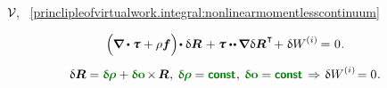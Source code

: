 \vspace{-0.1em} \noindent {}~${\mathcal{V}\hspace{-0.2ex}}$, ~\eqref{princlipleofvirtualwork.integral:nonlinearmomentlesscontinuum}

\nopagebreak\vspace{-0.2em}\begin{equation}\label{princlipleofvirtualwork.local:nonlinearmomentlesscontinuum}
\left(^{\mathstrut} \hspace{-0.2ex} \boldnabla \dotp \cauchystress + \rho \bm{f} \right) \hspace{-0.32ex} \dotp \variation{\bm{R}} \hspace{.2ex}
+ \cauchystress \dotdotp \hspace{-0.12ex} \boldnabla \hspace{.1ex} \variation{\bm{R}}^{\hspace{.1ex}\T} \hspace{-0.32ex}
+ \hspace{.1ex} \variation{\internalwork}
= \hspace{.1ex} 0 \hspace{.1ex}.
\end{equation}



\nopagebreak\vspace{-0.2em}\begin{equation}\label{princlipleofvirtualwork.worknullifies:nonlinearmomentlesscontinuum}
\variation{\bm{R}} = \constvarvector{\hspace{-0.1ex}\bm{\rho}} + \constvarvector{o} \hspace{-0.2ex} \times \hspace{-0.2ex} \bm{R} \hspace{.1ex}, \:
\constvarvector{\hspace{-0.1ex}\bm{\rho}} = \boldconst \hspace{.1ex}, \:
\constvarvector{o} = \boldconst
\hspace{.4ex}\Rightarrow\hspace{.2ex}
\variation{\internalwork} \hspace{-0.2ex} = 0 \hspace{.1ex}.
\end{equation}

